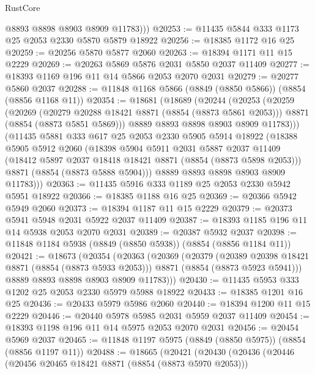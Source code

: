 \begin{lexlean}{RustCore}
\begin{coremodule}
          @8893
          @8898
          @8903
          @8909
          @11783)))
@20253 := @11435 @5844 @333 @1173 @25 @2053 @2330 @5870 @5879 @18922
@20256 := @18385 @1172 @16 @25
@20259 := @20256 @5870 @5877 @2060
@20263 := @18394 @1171 @11 @15 @2229
@20269 := @20263 @5869 @5876 @2031 @5850 @2037 @11409
@20277 := @18393 @1169 @196 @11 @14 @5866 @2053 @2070 @2031
@20279 := @20277 @5860 @2037
@20288 := @11848 @1168 @5866 (@8849 (@8850 @5866)) (@8854 (@8856 @1168 @11))
@20354 := @18681
    (@18689
      (@20244
        (@20253
          (@20259
            (@20269
              (@20279 @20288 @18421 @8871 (@8854 (@8873 @5861 @2053)))
              @8871
              (@8854 (@8873 @5851 @5869)))
            @8889
            @8893
            @8898
            @8903
            @8909
            @11783)))
      (@11435
        @5881
        @333
        @617
        @25
        @2053
        @2330
        @5905
        @5914
        @18922
        (@18388
          @5905
          @5912
          @2060
          (@18398
            @5904
            @5911
            @2031
            @5887
            @2037
            @11409
            (@18412 @5897 @2037 @18418 @18421 @8871 (@8854 (@8873 @5898 @2053)))
            @8871
            (@8854 (@8873 @5888 @5904)))
          @8889
          @8893
          @8898
          @8903
          @8909
          @11783)))
@20363 := @11435 @5916 @333 @1189 @25 @2053 @2330 @5942 @5951 @18922
@20366 := @18385 @1188 @16 @25
@20369 := @20366 @5942 @5949 @2060
@20373 := @18394 @1187 @11 @15 @2229
@20379 := @20373 @5941 @5948 @2031 @5922 @2037 @11409
@20387 := @18393 @1185 @196 @11 @14 @5938 @2053 @2070 @2031
@20389 := @20387 @5932 @2037
@20398 := @11848 @1184 @5938 (@8849 (@8850 @5938)) (@8854 (@8856 @1184 @11))
@20421 := @18673
    (@20354
      (@20363
        (@20369
          (@20379
            (@20389 @20398 @18421 @8871 (@8854 (@8873 @5933 @2053)))
            @8871
            (@8854 (@8873 @5923 @5941)))
          @8889
          @8893
          @8898
          @8903
          @8909
          @11783)))
@20430 := @11435 @5953 @333 @1202 @25 @2053 @2330 @5979 @5988 @18922
@20433 := @18385 @1201 @16 @25
@20436 := @20433 @5979 @5986 @2060
@20440 := @18394 @1200 @11 @15 @2229
@20446 := @20440 @5978 @5985 @2031 @5959 @2037 @11409
@20454 := @18393 @1198 @196 @11 @14 @5975 @2053 @2070 @2031
@20456 := @20454 @5969 @2037
@20465 := @11848 @1197 @5975 (@8849 (@8850 @5975)) (@8854 (@8856 @1197 @11))
@20488 := @18665
    (@20421
      (@20430
        (@20436
          (@20446
            (@20456 @20465 @18421 @8871 (@8854 (@8873 @5970 @2053)))

\end{coremodule}
\end{lexlean}
